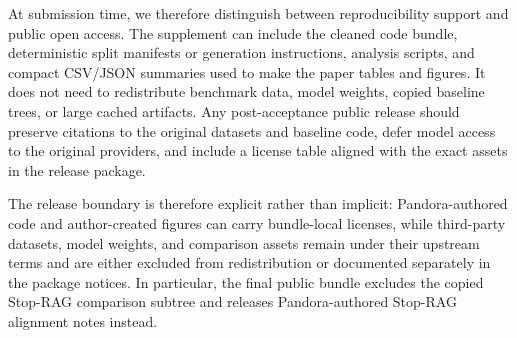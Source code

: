 \documentclass{article}
\begin{document}
At submission time, we therefore distinguish between reproducibility support and public open access. The supplement can include the cleaned code bundle, deterministic split manifests or generation instructions, analysis scripts, and compact CSV/JSON summaries used to make the paper tables and figures. It does not need to redistribute benchmark data, model weights, copied baseline trees, or large cached artifacts. Any post-acceptance public release should preserve citations to the original datasets and baseline code, defer model access to the original providers, and include a license table aligned with the exact assets in the release package.

The release boundary is therefore explicit rather than implicit: Pandora-authored code and author-created figures can carry bundle-local licenses, while third-party datasets, model weights, and comparison assets remain under their upstream terms and are either excluded from redistribution or documented separately in the package notices. In particular, the final public bundle excludes the copied Stop-RAG comparison subtree and releases Pandora-authored Stop-RAG alignment notes instead.

\clearpage

\end{document}
